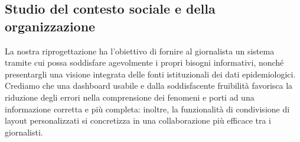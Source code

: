 \subsection{Studio del contesto sociale e della organizzazione}
\label{ss:studio-contesto-sociale-organizzazione}
La nostra riprogettazione ha l'obiettivo di fornire al giornalista un sistema tramite cui possa soddisfare agevolmente i propri bisogni informativi, nonché presentargli una visione integrata delle fonti istituzionali dei dati epidemiologici. Crediamo che una dashboard usabile e dalla soddisfacente fruibilità favorisca la riduzione degli errori nella comprensione dei fenomeni e porti ad una informazione corretta e più completa: inoltre, la funzionalità di condivisione di layout personalizzati si concretizza in una collaborazione più efficace tra i giornalisti.
